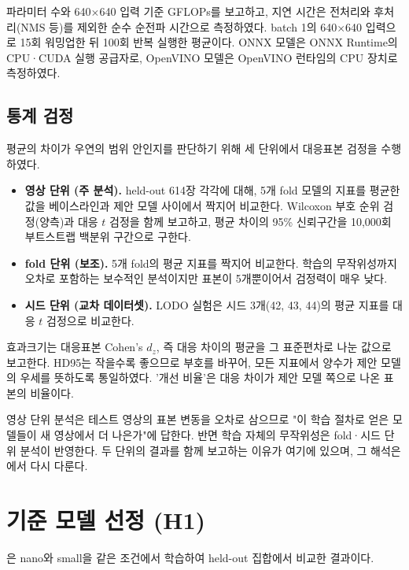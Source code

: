 파라미터 수와 640$\times$640 입력 기준 GFLOPs를 보고하고, 지연 시간은 전처리와 후처리(NMS 등)를 제외한
순수 순전파 시간으로 측정하였다. batch 1의 640$\times$640 입력으로 15회 워밍업한 뒤 100회 반복 실행한 평균이다.
ONNX 모델은 ONNX Runtime의 CPU·CUDA 실행 공급자로, OpenVINO 모델은 OpenVINO 런타임의 CPU 장치로 측정하였다.

\subsection{통계 검정}\label{sec:exp_stats}

평균의 차이가 우연의 범위 안인지를 판단하기 위해 세 단위에서 대응표본 검정을 수행하였다.

\begin{itemize}
  \item \textbf{영상 단위 (주 분석).} held-out 614장 각각에 대해, 5개 fold 모델의 지표를 평균한 값을 베이스라인과
    제안 모델 사이에서 짝지어 비교한다. Wilcoxon 부호 순위 검정\citep{wilcoxon1945}(양측)과 대응 $t$ 검정을 함께
    보고하고, 평균 차이의 95\% 신뢰구간을 10,000회 부트스트랩\citep{efron1993bootstrap} 백분위 구간으로 구한다.
  \item \textbf{fold 단위 (보조).} 5개 fold의 평균 지표를 짝지어 비교한다. 학습의 무작위성까지 오차로 포함하는
    보수적인 분석이지만 표본이 5개뿐이어서 검정력이 매우 낮다.
  \item \textbf{시드 단위 (교차 데이터셋).} LODO 실험은 시드 3개(42, 43, 44)의 평균 지표를 대응 $t$ 검정으로 비교한다.
\end{itemize}

효과크기는 대응표본 Cohen's $d_z$\citep{lakens2013effect}, 즉 대응 차이의 평균을 그 표준편차로 나눈 값으로 보고한다.
HD95는 작을수록 좋으므로 부호를 바꾸어, 모든 지표에서 양수가 제안 모델의 우세를 뜻하도록 통일하였다.
'개선 비율'은 대응 차이가 제안 모델 쪽으로 나온 표본의 비율이다.

영상 단위 분석은 테스트 영상의 표본 변동을 오차로 삼으므로 "이 학습 절차로 얻은 모델들이 새 영상에서 더 나은가"에
답한다. 반면 학습 자체의 무작위성은 fold·시드 단위 분석이 반영한다. 두 단위의 결과를 함께 보고하는 이유가
여기에 있으며, 그 해석은 에서 다시 다룬다.

\section{기준 모델 선정 (H1)}\label{sec:exp_baseline}

은 nano와 small을 같은 조건에서 학습하여 held-out 집합에서 비교한 결과이다.


